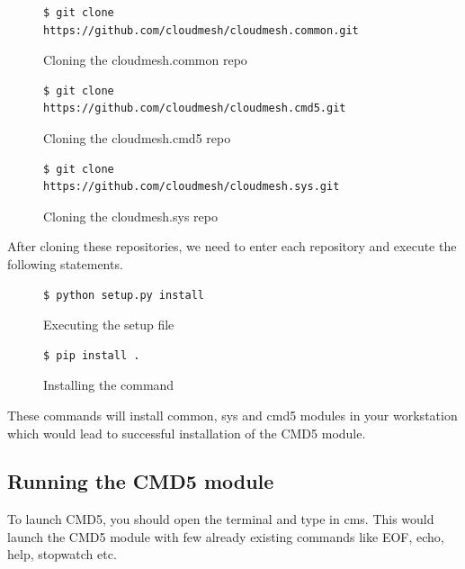 \documentclass[9pt,twocolumn,twoside]{../../styles/osajnl}
\begin{document}
{\begin{figure}[H]
\begin{verbatim}
$ git clone
https://github.com/cloudmesh/cloudmesh.common.git
\end{verbatim}
\caption{Cloning the cloudmesh.common repo}
\label{Cloning the cloudmesh.common repo}
\end{figure}

\begin{figure}[H]
\begin{verbatim}
$ git clone
https://github.com/cloudmesh/cloudmesh.cmd5.git
\end{verbatim}
\caption{Cloning the cloudmesh.cmd5 repo}
\label{Cloning the cloudmesh.cmd5 repo}
\end{figure}

\begin{figure}[H]
\begin{verbatim}
$ git clone
https://github.com/cloudmesh/cloudmesh.sys.git
\end{verbatim}
\caption{Cloning the cloudmesh.sys repo}
\label{Cloning the cloudmesh.sys repo}
\end{figure}

\noindent
After cloning these repositories, we need to enter each repository and
execute the following statements.
\newline

\begin{figure}[H]
\begin{verbatim}
$ python setup.py install
\end{verbatim}
\caption{Executing the setup file}
\label{Executing the setup file}
\end{figure}

\begin{figure}[H]
\begin{verbatim}
$ pip install .
\end{verbatim}
\caption{Installing the command}
\label{Installing the command}
\end{figure}

\noindent
These commands will install common, sys and cmd5 modules in your
workstation which would lead to successful installation of the CMD5
module.

\subsection{Running the CMD5 module}
To launch CMD5, you should open the terminal and type in cms. This
would launch the CMD5 module with few already existing commands like
EOF, echo, help, stopwatch etc.

}
\end{document}
